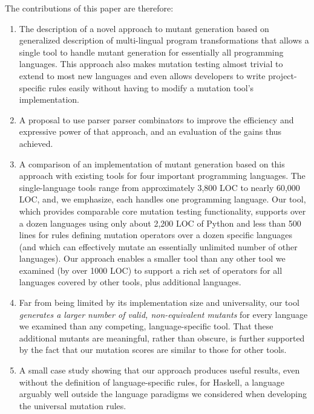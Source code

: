 \documentclass[acmsmall]{acmart}
\begin{document}
The contributions of this paper are therefore:

\begin{enumerate}
  \item The description of a novel approach to mutant generation
    based on generalized description of multi-lingual program transformations
    that allows a single tool to handle mutant generation for
    essentially all programming languages.  This approach also makes
    mutation testing almost trivial to extend to most new languages and even allows
    developers to write project-specific rules easily without
    having to modify a mutation tool's implementation.

          \item A proposal to use parser parser combinators to improve the
      efficiency and expressive power of that approach, and an
      evaluation of the gains thus achieved.

    
      \item A comparison of an implementation of mutant generation
       based on this approach with existing tools for four important
       programming languages.  The single-language tools range from
       approximately 3,800 LOC to nearly 60,000 LOC, and, we emphasize, each handles
       one programming language.  Our tool, which provides comparable
       core mutation testing functionality, supports over a dozen
       languages using only about 2,200 LOC of Python and less than 500
       lines for rules defining mutation operators over a dozen
       specific languages (and which can effectively mutate an
       essentially unlimited number of other languages).  Our
       approach enables a smaller tool than any other tool
       we examined (by over 1000 LOC) to support a rich set of
       operators for all languages covered by other tools, plus additional languages.
       \item Far from being limited by its implementation size and
         universality, our tool \emph{generates a larger number of valid,
         non-equivalent mutants} for every language we examined than
         any competing, language-specific tool.  That these additional
         mutants
         are meaningful, rather than obscure, is further supported by
         the fact that our mutation scores are similar to those for
         other tools.

       \item A small case study showing that our approach produces
         useful results, even without the definition of
         language-specific rules, for Haskell, a language arguably
         well outside the language paradigms we considered when
         developing the universal mutation rules.

       \end{enumerate}
\end{document}
